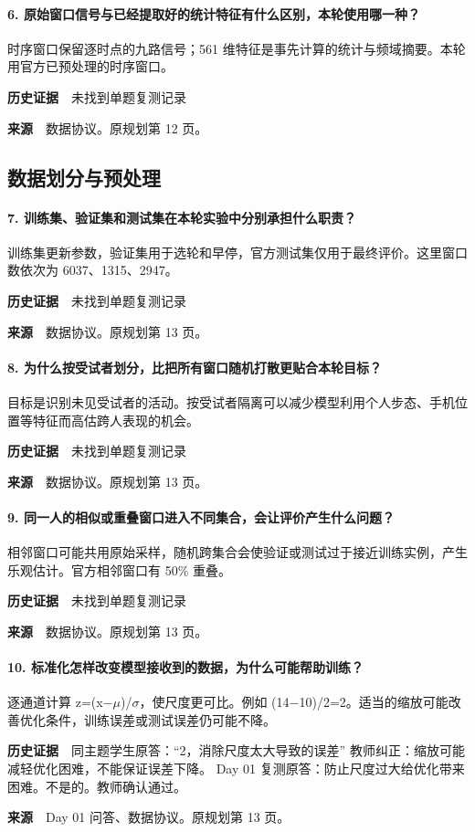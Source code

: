 \paragraph{6. 原始窗口信号与已经提取好的统计特征有什么区别，本轮使用哪一种？}
时序窗口保留逐时点的九路信号；561 维特征是事先计算的统计与频域摘要。本轮用官方已预处理的时序窗口。\par
\textbf{历史证据}　未找到单题复测记录\par
\textbf{来源}　数据协议。原规划第 12 页。\par
\clearpage\subsection{数据划分与预处理}
\paragraph{7. 训练集、验证集和测试集在本轮实验中分别承担什么职责？}
训练集更新参数，验证集用于选轮和早停，官方测试集仅用于最终评价。这里窗口数依次为 6037、1315、2947。\par
\textbf{历史证据}　未找到单题复测记录\par
\textbf{来源}　数据协议。原规划第 13 页。\par
\paragraph{8. 为什么按受试者划分，比把所有窗口随机打散更贴合本轮目标？}
目标是识别未见受试者的活动。按受试者隔离可以减少模型利用个人步态、手机位置等特征而高估跨人表现的机会。\par
\textbf{历史证据}　未找到单题复测记录\par
\textbf{来源}　数据协议。原规划第 13 页。\par
\paragraph{9. 同一人的相似或重叠窗口进入不同集合，会让评价产生什么问题？}
相邻窗口可能共用原始采样，随机跨集合会使验证或测试过于接近训练实例，产生乐观估计。官方相邻窗口有 50\% 重叠。\par
\textbf{历史证据}　未找到单题复测记录\par
\textbf{来源}　数据协议。原规划第 13 页。\par
\paragraph{10. 标准化怎样改变模型接收到的数据，为什么可能帮助训练？}
逐通道计算 z=(x\(\mathord{-}\)\(\mu\))/\(\sigma\)，使尺度更可比。例如 (14\(\mathord{-}\)10)/2=2。适当的缩放可能改善优化条件，训练误差或测试误差仍可能不降。\par
\textbf{历史证据}　同主题学生原答：“2，消除尺度太大导致的误差” 教师纠正：缩放可能减轻优化困难，不能保证误差下降。 Day 01 复测原答：防止尺度过大给优化带来困难。不是的。教师确认通过。\par
\textbf{来源}　Day 01 问答、数据协议。原规划第 13 页。\par
